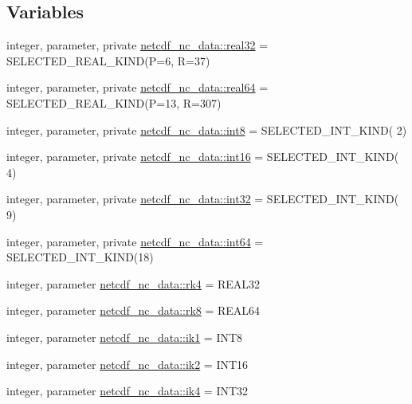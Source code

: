 \subsection*{Variables}
\begin{DoxyCompactItemize}
\item 
integer, parameter, private \hyperlink{namespacenetcdf__nc__data_a49ce5cf5f98711e2fb1c1d1fff07ced3}{netcdf\+\_\+nc\+\_\+data\+::real32} = S\+E\+L\+E\+C\+T\+E\+D\+\_\+\+R\+E\+A\+L\+\_\+\+K\+I\+ND(P=6, R=37)
\item 
integer, parameter, private \hyperlink{namespacenetcdf__nc__data_ab45e80c04977fcdc637bf85e96fb1bbd}{netcdf\+\_\+nc\+\_\+data\+::real64} = S\+E\+L\+E\+C\+T\+E\+D\+\_\+\+R\+E\+A\+L\+\_\+\+K\+I\+ND(P=13, R=307)
\item 
integer, parameter, private \hyperlink{namespacenetcdf__nc__data_a7a38aef8544775b499eab82d49160d8f}{netcdf\+\_\+nc\+\_\+data\+::int8} = S\+E\+L\+E\+C\+T\+E\+D\+\_\+\+I\+N\+T\+\_\+\+K\+I\+ND( 2)
\item 
integer, parameter, private \hyperlink{namespacenetcdf__nc__data_afb8a8087476621863a989d4767e0098b}{netcdf\+\_\+nc\+\_\+data\+::int16} = S\+E\+L\+E\+C\+T\+E\+D\+\_\+\+I\+N\+T\+\_\+\+K\+I\+ND( 4)
\item 
integer, parameter, private \hyperlink{namespacenetcdf__nc__data_a46f18116f7eef966c6ca8e2a32146c1f}{netcdf\+\_\+nc\+\_\+data\+::int32} = S\+E\+L\+E\+C\+T\+E\+D\+\_\+\+I\+N\+T\+\_\+\+K\+I\+ND( 9)
\item 
integer, parameter, private \hyperlink{namespacenetcdf__nc__data_a1fdc3bacc11102e964238610883f87aa}{netcdf\+\_\+nc\+\_\+data\+::int64} = S\+E\+L\+E\+C\+T\+E\+D\+\_\+\+I\+N\+T\+\_\+\+K\+I\+ND(18)
\item 
integer, parameter \hyperlink{namespacenetcdf__nc__data_a223f303ec527e29600c338ab11a44f1e}{netcdf\+\_\+nc\+\_\+data\+::rk4} = R\+E\+A\+L32
\item 
integer, parameter \hyperlink{namespacenetcdf__nc__data_ade82ed46db72e1615dada1c3ead06d51}{netcdf\+\_\+nc\+\_\+data\+::rk8} = R\+E\+A\+L64
\item 
integer, parameter \hyperlink{namespacenetcdf__nc__data_abec5c1fcdc88e0df15e1881f76fe2009}{netcdf\+\_\+nc\+\_\+data\+::ik1} = I\+N\+T8
\item 
integer, parameter \hyperlink{namespacenetcdf__nc__data_a2737071cdb438e603153e900a48f747e}{netcdf\+\_\+nc\+\_\+data\+::ik2} = I\+N\+T16
\item 
integer, parameter \hyperlink{namespacenetcdf__nc__data_a4704b689ce13181f04478d859655b674}{netcdf\+\_\+nc\+\_\+data\+::ik4} = I\+N\+T32

\end{DoxyCompactItemize}
